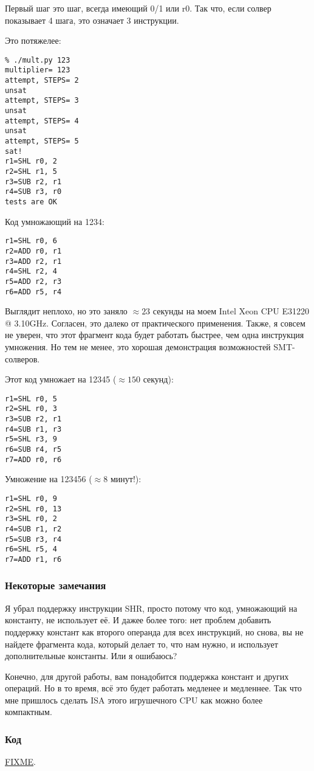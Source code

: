 Первый шаг это шаг, всегда имеющий 0/1 или r0.
Так что, если солвер показывает 4 шага, это означает 3 инструкции.

Это потяжелее:

\begin{lstlisting}
% ./mult.py 123
multiplier= 123
attempt, STEPS= 2
unsat
attempt, STEPS= 3
unsat
attempt, STEPS= 4
unsat
attempt, STEPS= 5
sat!
r1=SHL r0, 2
r2=SHL r1, 5
r3=SUB r2, r1
r4=SUB r3, r0
tests are OK
\end{lstlisting}

Код умножающий на 1234:

\begin{lstlisting}
r1=SHL r0, 6
r2=ADD r0, r1
r3=ADD r2, r1
r4=SHL r2, 4
r5=ADD r2, r3
r6=ADD r5, r4
\end{lstlisting}

Выглядит неплохо, но это заняло $\approx 23$ секунды на моем Intel Xeon CPU E31220 @ 3.10GHz.
Согласен, это далеко от практического применения.
Также, я совсем не уверен, что этот фрагмент кода будет работать быстрее, чем одна инструкция умножения.
Но тем не менее, это хорошая демонстрация возможностей SMT-солверов.

Этот код умножает на 12345 ($\approx 150$ секунд):

\begin{lstlisting}
r1=SHL r0, 5
r2=SHL r0, 3
r3=SUB r2, r1
r4=SUB r1, r3
r5=SHL r3, 9
r6=SUB r4, r5
r7=ADD r0, r6
\end{lstlisting}

Умножение на 123456 ($\approx 8$ минут!):

\begin{lstlisting}
r1=SHL r0, 9
r2=SHL r0, 13
r3=SHL r0, 2
r4=SUB r1, r2
r5=SUB r3, r4
r6=SHL r5, 4
r7=ADD r1, r6
\end{lstlisting}

\subsubsection{Некоторые замечания}

Я убрал поддержку инструкции SHR, просто потому что код, умножающий на константу, не использует её.
И дажее более того: нет проблем добавить поддержку констант как второго операнда для всех инструкций,
но снова, вы не найдете фрагмента кода, который делает то, что нам нужно, и использует дополнительные константы.
Или я ошибаюсь?

Конечно, для другой работы, вам понадобится поддержка констант и других операций.
Но в то время, всё это будет работать медленее и медленнее.
Так что мне пришлось сделать \ac{ISA} этого игрушечного \ac{CPU} как можно более компактным.

\subsubsection{Код}

\url{FIXME}.

